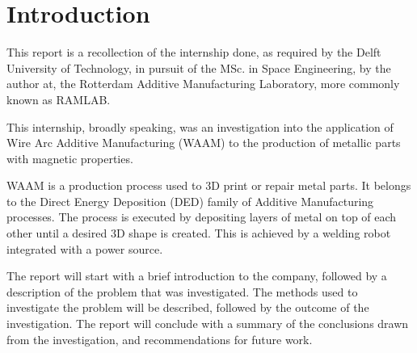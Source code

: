 \section*{Introduction}

This report is a recollection of the internship done, as required by the
Delft University of Technology, in pursuit of the MSc. in Space Engineering,
by the author at, the Rotterdam
Additive Manufacturing Laboratory, more commonly known as RAMLAB.

This internship, broadly speaking, was an investigation into the
application of Wire Arc Additive Manufacturing (WAAM) to the production of
metallic parts with magnetic properties.

WAAM is a production process used to 3D print or repair metal parts. It belongs to the Direct Energy Deposition (DED) family of Additive Manufacturing processes. The process is executed by depositing layers of metal on top of each other until a desired 3D shape is created. This is achieved by a welding robot integrated with a power source.

The report will start with a brief introduction to the company, followed by
a description of the problem that was investigated. The methods used to
investigate the problem will be described, followed by the outcome of the
investigation. The report will conclude with a summary of the conclusions
drawn from the investigation, and recommendations for future work.
